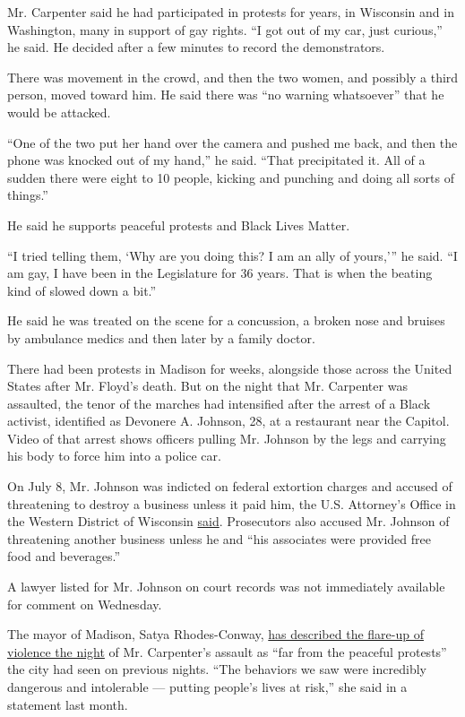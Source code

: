 Mr. Carpenter said he had participated in protests for years, in
Wisconsin and in Washington, many in support of gay rights. ``I got out
of my car, just curious,'' he said. He decided after a few minutes to
record the demonstrators.

There was movement in the crowd, and then the two women, and possibly a
third person, moved toward him. He said there was ``no warning
whatsoever'' that he would be attacked.

``One of the two put her hand over the camera and pushed me back, and
then the phone was knocked out of my hand,'' he said. ``That
precipitated it. All of a sudden there were eight to 10 people, kicking
and punching and doing all sorts of things.''

He said he supports peaceful protests and Black Lives Matter.

``I tried telling them, `Why are you doing this? I am an ally of
yours,''' he said. ``I am gay, I have been in the Legislature for 36
years. That is when the beating kind of slowed down a bit.''

He said he was treated on the scene for a concussion, a broken nose and
bruises by ambulance medics and then later by a family doctor.

There had been protests in Madison for weeks, alongside those across the
United States after Mr. Floyd's death. But on the night that Mr.
Carpenter was assaulted, the tenor of the marches had intensified after
the arrest of a Black activist, identified as Devonere A. Johnson, 28,
at a restaurant near the Capitol. Video of that arrest shows officers
pulling Mr. Johnson by the legs and carrying his body to force him into
a police car.

On July 8, Mr. Johnson was indicted on federal extortion charges and
accused of threatening to destroy a business unless it paid him, the
U.S. Attorney's Office in the Western District of Wisconsin
\href{https://www.justice.gov/usao-wdwi/pr/grand-jury-returns-indictments-100}{said}.
Prosecutors also accused Mr. Johnson of threatening another business
unless he and ``his associates were provided free food and beverages.''

A lawyer listed for Mr. Johnson on court records was not immediately
available for comment on Wednesday.

The mayor of Madison, Satya Rhodes-Conway,
\href{https://www.cityofmadison.com/news/mayor-rhodes-conway-city-leaders-announce-agreement-to-end-school-resource-officer-contracts}{has
described the flare-up of violence the night} of Mr. Carpenter's assault
as ``far from the peaceful protests'' the city had seen on previous
nights. ``The behaviors we saw were incredibly dangerous and intolerable
--- putting people's lives at risk,'' she said in a statement last
month.

